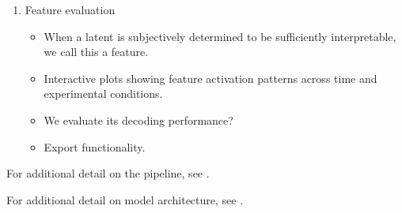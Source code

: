 \begin{enumerate}
    \item Feature evaluation
    \begin{itemize}
        \item When a latent is subjectively determined to be sufficiently interpretable, we call this a feature.
        \item Interactive plots showing feature activation patterns across time and experimental conditions.
        \item We evaluate its decoding performance?
        \item Export functionality.
    \end{itemize}
\end{enumerate}

For additional detail on the pipeline, see .

For additional detail on model architecture, see .




